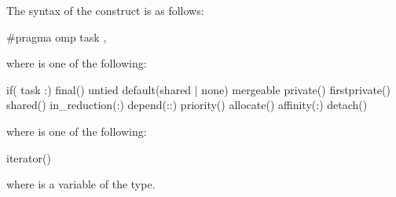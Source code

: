 \syntax
\begin{ccppspecific}
\begin{samepage}
The syntax of the  construct is as follows:

\begin{ompcPragma}
#pragma omp task \plc{[clause[ [},\plc{] clause] ... ] new-line}
\end{ompcPragma}
\end{samepage}

\begin{samepage}
where  is one of the following{}:

\begin{indentedcodelist}
if(\plc{[} task :\plc{] scalar-expression})
final()
untied
default(shared \textnormal{|} none)
mergeable
private()
firstprivate()
shared()
in_reduction(:)
depend(\plc{[depend-modifier}:\plc{][dependence-type }:\plc{] locator-list})
priority()
allocate(\plc{[allocator: ]})
affinity(\plc{[aff-modifier }:\plc{] locator-list})
detach()
\end{indentedcodelist}

where  is one of the following{}:
\begin{indentedcodelist}
iterator() 
\end{indentedcodelist}

where  is a variable of the  type.

\end{samepage}
\end{ccppspecific}

